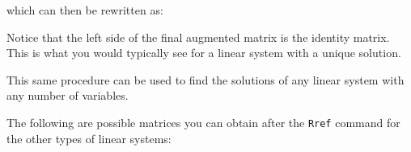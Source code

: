 \documentclass[a5paper,draft]{memoir}
\def\code#1{\texttt{#1}}
\begin{document}
which can then be rewritten as:
\begin{center}
\end{center}

Notice that the left side of the final augmented matrix is the identity matrix. This is what you would typically see for a linear system with a unique solution.

This same procedure can be used to find the solutions of any linear system with any number of variables.

The following are possible matrices you can obtain after the \code{Rref} command for the other types of linear systems:
\end{document}
